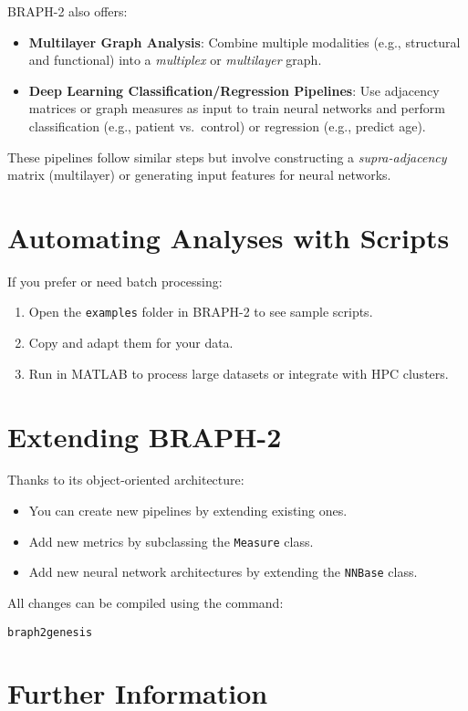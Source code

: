 \documentclass[justified]{tufte-handout}
\begin{document}
BRAPH-2 also offers:
\begin{itemize}
    \item \textbf{Multilayer Graph Analysis}: Combine multiple modalities (e.g., structural and functional) into a \textit{multiplex} or \textit{multilayer} graph.
    \item \textbf{Deep Learning Classification/Regression Pipelines}: Use adjacency matrices or graph measures as input to train neural networks and perform classification (e.g., patient vs.\ control) or regression (e.g., predict age).
\end{itemize}
These pipelines follow similar steps but involve constructing a \textit{supra-adjacency} matrix (multilayer) or generating input features for neural networks.

\section{Automating Analyses with Scripts}

If you prefer or need batch processing:
\begin{enumerate}
    \item Open the \texttt{examples} folder in BRAPH-2 to see sample scripts.
    \item Copy and adapt them for your data.  
    \item Run in MATLAB to process large datasets or integrate with HPC clusters.
\end{enumerate}

\section{Extending BRAPH-2}

Thanks to its object-oriented architecture:
\begin{itemize}
    \item You can create new pipelines by extending existing ones.
    \item Add new metrics by subclassing the \texttt{Measure} class.
    \item Add new neural network architectures by extending the \texttt{NNBase} class.
\end{itemize}
All changes can be compiled using the command:
\begin{verbatim}
braph2genesis
\end{verbatim}

\section{Further Information}
\end{document}
